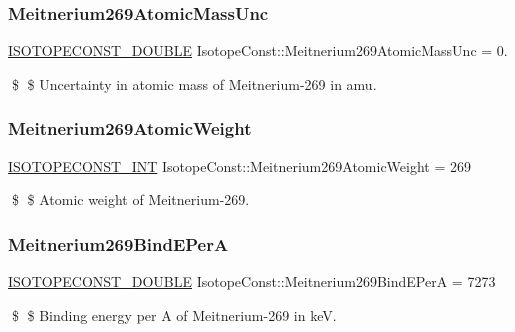 \subsubsection{\texorpdfstring{Meitnerium269\+Atomic\+Mass\+Unc}{Meitnerium269AtomicMassUnc}}
{\footnotesize\ttfamily \mbox{\hyperlink{group___isotope_const-_macros_ga8f45a7272ce02c0b4c65c44636ed719a}{I\+S\+O\+T\+O\+P\+E\+C\+O\+N\+S\+T\+\_\+\+D\+O\+U\+B\+LE}} Isotope\+Const\+::\+Meitnerium269\+Atomic\+Mass\+Unc = 0.}

\$ \$ Uncertainty in atomic mass of Meitnerium-\/269 in amu. \mbox{\label{group___isotope_const-_meitnerium-_mt269_ga9e66e0ef571ccc752f2c80226579a773}} 
\subsubsection{\texorpdfstring{Meitnerium269\+Atomic\+Weight}{Meitnerium269AtomicWeight}}
{\footnotesize\ttfamily \mbox{\hyperlink{group___isotope_const-_macros_ga5f18360b3e99483a35c32d789e62621c}{I\+S\+O\+T\+O\+P\+E\+C\+O\+N\+S\+T\+\_\+\+I\+NT}} Isotope\+Const\+::\+Meitnerium269\+Atomic\+Weight = 269}

\$ \$ Atomic weight of Meitnerium-\/269. \mbox{\label{group___isotope_const-_meitnerium-_mt269_ga32ba6867ea85fe26e55949d0da4a5504}} 
\subsubsection{\texorpdfstring{Meitnerium269\+Bind\+E\+PerA}{Meitnerium269BindEPerA}}
{\footnotesize\ttfamily \mbox{\hyperlink{group___isotope_const-_macros_ga8f45a7272ce02c0b4c65c44636ed719a}{I\+S\+O\+T\+O\+P\+E\+C\+O\+N\+S\+T\+\_\+\+D\+O\+U\+B\+LE}} Isotope\+Const\+::\+Meitnerium269\+Bind\+E\+PerA = 7273}

\$ \$ Binding energy per A of Meitnerium-\/269 in keV. \mbox{\label{group___isotope_const-_meitnerium-_mt269_gad73daa07278ad2cad56a684761d8883f}} 
